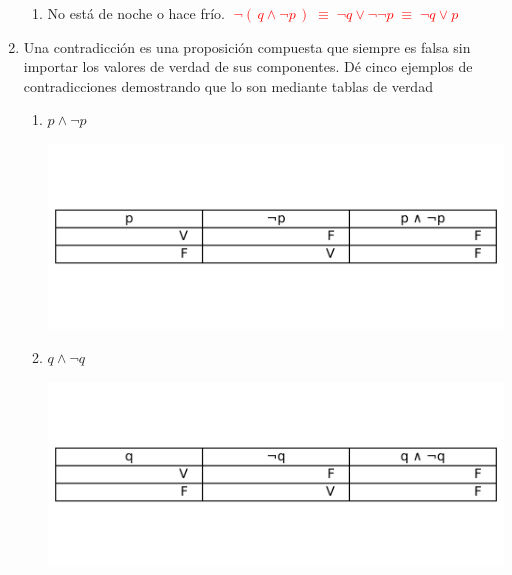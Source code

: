 \documentclass[12pt,letterpaper]{exam}
\begin{document}
\begin{enumerate}
\begin{enumerate}[label=\alph*)]
  \item No está de noche o hace frío. 
        \textcolor{red}{$\;\neg(\,q \land \neg p\,)\;\equiv\; \neg q \lor \neg\neg p \;\equiv\; \neg q \lor p$}
\end{enumerate}
\newpage
\item Una contradicción es una proposición compuesta que siempre es falsa sin importar los valores de 
verdad de sus componentes. Dé cinco ejemplos de contradicciones demostrando que lo son 
mediante tablas de verdad

\begin{enumerate}[label=\alph*)]
  \item $p \land \neg p$  
  \begin{center}
    \includegraphics[height=0.3\textheight]{../assets/Talleres_fundamentos/ercicio_9_tabla_01.png}
  \end{center}

  \item $q \land \neg q$  
  \begin{center}
    \includegraphics[height=0.3\textheight]{../assets/Talleres_fundamentos/ercicio_9_tabla_02.png}
  \end{center}


\end{enumerate}
\end{enumerate}
\end{document}
